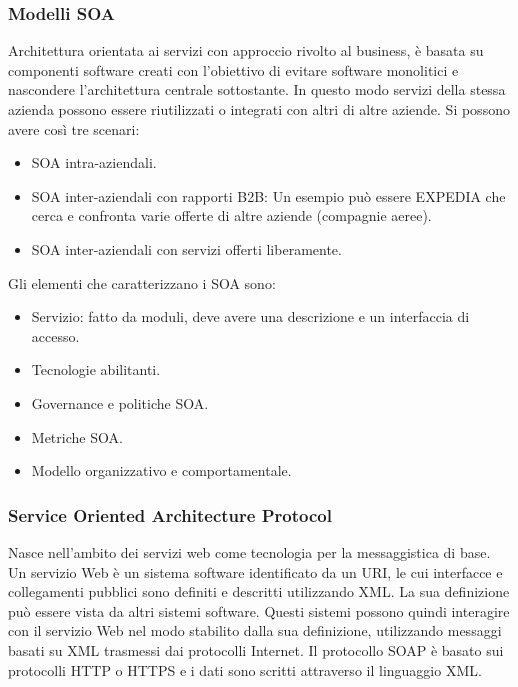 \documentclass{article}
\begin{document}
		\subsubsection{Modelli SOA}
		Architettura orientata ai servizi con approccio rivolto al business, è basata su componenti software creati con l'obiettivo di evitare software monolitici e nascondere l'architettura centrale sottostante. 
		In questo modo servizi della stessa azienda possono essere riutilizzati o integrati con altri di altre aziende.
		Si possono avere così tre scenari:
		\begin{itemize}
		    \item SOA intra-aziendali.
		    \item SOA inter-aziendali con rapporti B2B: Un esempio può essere EXPEDIA che cerca e confronta varie offerte di altre aziende (compagnie aeree).
		    \item SOA inter-aziendali con servizi offerti liberamente.
		\end{itemize}
		Gli elementi che caratterizzano i SOA sono:
		\begin{itemize}
		    \item Servizio: fatto da moduli, deve avere una descrizione e un interfaccia di accesso.
		    \item Tecnologie abilitanti.
		    \item Governance e politiche SOA.
		    \item Metriche SOA.
		    \item Modello organizzativo e comportamentale.
		\end{itemize}
		
		\subsubsection{Service Oriented Architecture Protocol}
		Nasce nell'ambito dei servizi web come tecnologia per la messaggistica di base.\\
		Un servizio Web è un sistema software identificato da un URI, le cui interfacce e collegamenti pubblici sono definiti e descritti utilizzando XML. La sua definizione può essere vista da altri sistemi software.
		Questi sistemi possono quindi interagire con il servizio Web nel modo stabilito dalla sua definizione, utilizzando messaggi basati su XML trasmessi dai protocolli Internet.
		Il protocollo SOAP è basato sui protocolli HTTP o HTTPS e i dati sono scritti attraverso il linguaggio XML.
		
\end{document}
